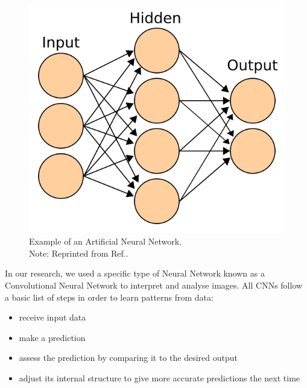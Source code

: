 \documentclass[conference]{IEEEtran}
\begin{document}
\begin{figure}[htb!]  %
  \centering
  \includegraphics[scale=0.3]{images/Artificial_neural_network.png}
  \caption{Example of an Artificial Neural Network. \\ \centering Note: Reprinted from Ref.\cite{Artificial_Neural_Network}.}
  \label{fig:Artificial_Neural_Network}
\end{figure}

In our research, we used a specific type of Neural Network known as a Convolutional Neural Network to interpret and analyse images. All CNNs follow a basic list of steps in order to learn patterns from data:
\begin{itemize}
\item receive input data
\item make a prediction
\item assess the prediction by comparing it to the desired output
\item adjust its internal structure to give more accurate predictions the next time
\end{itemize}
\end{document}

